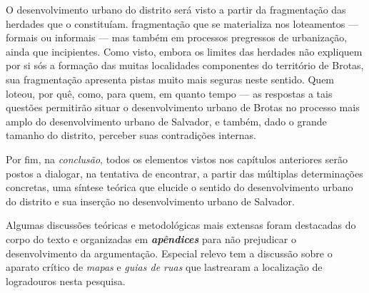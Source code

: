 O desenvolvimento urbano do distrito será visto a partir da fragmentação das herdades que o constituíam. fragmentação que se materializa nos loteamentos --- formais ou informais --- mas também em processos pregressos de urbanização, ainda que incipientes. Como visto, embora os limites das herdades não expliquem por si sós a formação das muitas localidades componentes do território de Brotas, sua fragmentação apresenta pistas muito mais seguras neste sentido. Quem loteou, por quê, como, para quem, em quanto tempo --- as respostas a tais questões permitirão situar o desenvolvimento urbano de Brotas no processo mais amplo do desenvolvimento urbano de Salvador, e também, dado o grande tamanho do distrito, perceber suas contradições internas.

Por fim, na \textit{conclusão}, todos os elementos vistos nos capítulos anteriores serão postos a dialogar, na tentativa de encontrar, a partir das múltiplas determinações concretas, uma síntese teórica que elucide o sentido do desenvolvimento urbano do distrito e sua inserção no desenvolvimento urbano de Salvador. 

Algumas discussões teóricas e metodológicas mais extensas foram destacadas do corpo do texto e organizadas em \textbf{\textit{apêndices}} para não prejudicar o desenvolvimento da argumentação. Especial relevo tem a discussão sobre o aparato crítico de \textit{mapas} e \textit{guias de ruas} que lastrearam a localização de logradouros nesta pesquisa.


